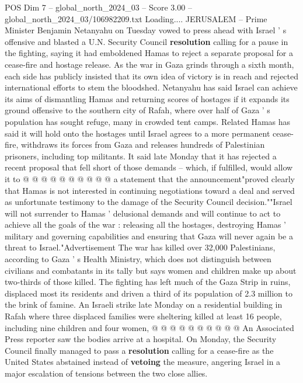 \begin{textsample}{POS Dim 7 – global\_north\_2024\_03 – Score 3.00 – global\_north\_2024\_03/106982209.txt}  \label{ex:f7_pos_215}
Loading....
JERUSALEM -- Prime Minister Benjamin Netanyahu on Tuesday vowed to press ahead with Israel ' s offensive and blasted a U.N.
Security Council \textbf{resolution} calling for a pause in the fighting, saying it had emboldened Hamas to reject a separate proposal for a cease-fire and hostage release.
As the war in Gaza grinds through a sixth month, each side has publicly insisted that its own idea of victory is in reach and rejected international efforts to stem the bloodshed.
Netanyahu has said Israel can achieve its aims of dismantling Hamas and returning scores of hostages if it expands its ground offensive to the southern city of Rafah, where over half of Gaza ' s population has sought refuge, many in crowded tent camps.
Related Hamas has said it will hold onto the hostages until Israel agrees to a more permanent cease-fire, withdraws its forces from Gaza and releases hundreds of Palestinian prisoners, including top militants.
It said late Monday that it has rejected a recent proposal that fell short of those demands -- which, if fulfilled, would allow it to @ @ @ @ @ @ @ @ @ @ a statement that the announcement"proved clearly that Hamas is not interested in continuing negotiations toward a deal and served as unfortunate testimony to the damage of the Security Council decision.""Israel will not surrender to Hamas ' delusional demands and will continue to act to achieve all the goals of the war : releasing all the hostages, destroying Hamas ' military and governing capabilities and ensuring that Gaza will never again be a threat to Israel."Advertisement The war has killed over 32,000 Palestinians, according to Gaza ' s Health Ministry, which does not distinguish between civilians and combatants in its tally but says women and children make up about two-thirds of those killed.
The fighting has left much of the Gaza Strip in ruins, displaced most its residents and driven a third of its population of 2.3 million to the brink of famine.
An Israeli strike late Monday on a residential building in Rafah where three displaced families were sheltering killed at least 16 people, including nine children and four women, @ @ @ @ @ @ @ @ @ @ An Associated Press reporter saw the bodies arrive at a hospital.
On Monday, the Security Council finally managed to pass a \textbf{resolution} calling for a cease-fire as the United States abstained instead of \textbf{vetoing} the measure, angering Israel in a major escalation of tensions between the two close allies.

\end{textsample}
